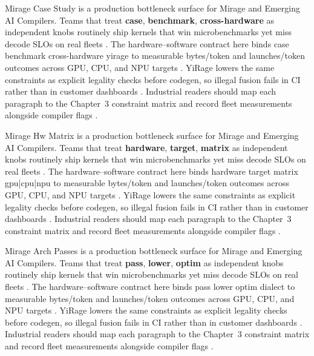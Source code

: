 Mirage Case Study is a production bottleneck surface for Mirage and Emerging AI Compilers. Teams that treat \textbf{case}, \textbf{benchmark}, \textbf{cross-hardware} as independent knobs routinely ship kernels that win microbenchmarks yet miss decode SLOs on real fleets \citep{taxbreak2026,semianalysis2024tma}. The hardware--software contract here binds case benchmark cross-hardware yirage to measurable bytes/token and launches/token outcomes across GPU, CPU, and NPU targets \citep{memoryfloor2026,amd2024xdna}. YiRage lowers the same constraints as explicit legality checks before codegen, so illegal fusion fails in CI rather than in customer dashboards \citep{nvidia2022hopper,amd2024aie}. Industrial readers should map each paragraph to the Chapter~3 constraint matrix and record fleet measurements alongside compiler flags \citep{semianalysis2024tma,dlbook}.

Mirage Hw Matrix is a production bottleneck surface for Mirage and Emerging AI Compilers. Teams that treat \textbf{hardware}, \textbf{target}, \textbf{matrix} as independent knobs routinely ship kernels that win microbenchmarks yet miss decode SLOs on real fleets \citep{memoryfloor2026,amd2024xdna}. The hardware--software contract here binds hardware target matrix gpu|cpu|npu to measurable bytes/token and launches/token outcomes across GPU, CPU, and NPU targets \citep{nvidia2022hopper,amd2024aie}. YiRage lowers the same constraints as explicit legality checks before codegen, so illegal fusion fails in CI rather than in customer dashboards \citep{semianalysis2024tma,dlbook}. Industrial readers should map each paragraph to the Chapter~3 constraint matrix and record fleet measurements alongside compiler flags \citep{amd2024xdna,dao2022flashattention}.

Mirage Arch Passes is a production bottleneck surface for Mirage and Emerging AI Compilers. Teams that treat \textbf{pass}, \textbf{lower}, \textbf{optim} as independent knobs routinely ship kernels that win microbenchmarks yet miss decode SLOs on real fleets \citep{nvidia2022hopper,amd2024aie}. The hardware--software contract here binds pass lower optim dialect to measurable bytes/token and launches/token outcomes across GPU, CPU, and NPU targets \citep{semianalysis2024tma,dlbook}. YiRage lowers the same constraints as explicit legality checks before codegen, so illegal fusion fails in CI rather than in customer dashboards \citep{amd2024xdna,dao2022flashattention}. Industrial readers should map each paragraph to the Chapter~3 constraint matrix and record fleet measurements alongside compiler flags \citep{amd2024aie,kwon2023vllm}.

